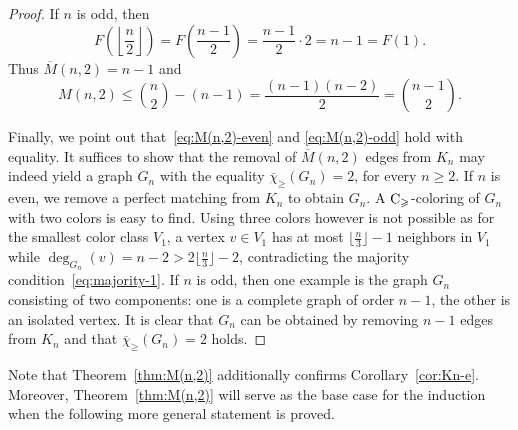 \documentclass{article}
\theoremstyle{definition}
\newcommand{\mc}{\overline{\chi}_{\geqslant}}
\newcommand{\cg}{{\rm C}_{\geqslant}}
\begin{document}
\begin{proof}
     If $n$ is odd, then
   $$
   F\left(\left\lfloor \frac{n}{2} \right\rfloor \right) = F\left(\frac{n-1}{2}\right) = \frac{n-1}{2} \cdot 2 = n-1 =F(1).
   $$
    Thus $\overline{M}(n,2) = n-1$ and
    \begin{equation} \label{eq:M(n,2)-odd}
        M(n,2) \leq  {n \choose 2} - (n-1) 
     = \frac{(n-1)(n-2)}{2}
     = {n-1 \choose 2}.
    \end{equation} 
     

     Finally, we point out that~\eqref{eq:M(n,2)-even} and \eqref{eq:M(n,2)-odd} hold with equality. It suffices to show that the removal of $\overline{M}(n,2)$ edges from $K_n$ may indeed yield a graph $G_n$ with the equality $\mc(G_n)=2$, for every $n \ge 2$.
     If $n$ is even, we remove a perfect matching from $K_n$ to obtain $G_n$. A $\cg$-coloring of $G_n$ with two colors is easy to find. Using three colors however is not possible as for the smallest color class $V_1$, a vertex $v \in V_1$ has at most $\lfloor \frac{n}{3} \rfloor-1$ neighbors in $V_1$ while $\deg_{G_n}(v) =n-2 > 2 \lfloor \frac{n}{3} \rfloor -2$, contradicting the majority condition~\eqref{eq:majority-1}. 
     If $n$ is odd, then one example is the graph $G_n$ consisting of two components: one is a complete graph of order $n-1$, the other is an isolated vertex. It is clear that $G_n$ can be obtained by removing $n-1$ edges from $K_n$ and that $\mc(G_n)=2$ holds.
   \end{proof}

Note that Theorem~\ref{thm:M(n,2)} additionally confirms Corollary~\ref{cor:Kn-e}. Moreover, Theorem~\ref{thm:M(n,2)} will serve as the base case for the induction when the following more general statement is proved. 
\end{document}
